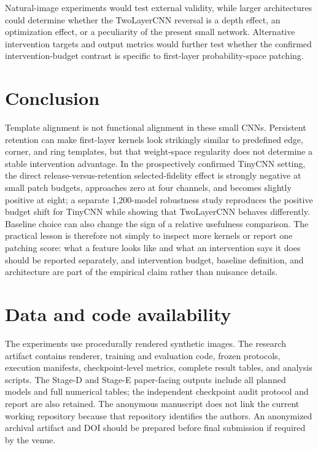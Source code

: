 \documentclass[10pt]{article}
\begin{document}
Natural-image experiments would test external validity, while larger architectures could determine whether the TwoLayerCNN reversal is a depth effect, an optimization effect, or a peculiarity of the present small network. Alternative intervention targets and output metrics would further test whether the confirmed intervention-budget contrast is specific to first-layer probability-space patching.

\section{Conclusion}\label{sec:conclusion}

Template alignment is not functional alignment in these small CNNs. Persistent retention can make first-layer kernels look strikingly similar to predefined edge, corner, and ring templates, but that weight-space regularity does not determine a stable intervention advantage. In the prospectively confirmed TinyCNN setting, the direct release-versus-retention selected-fidelity effect is strongly negative at small patch budgets, approaches zero at four channels, and becomes slightly positive at eight; a separate 1,200-model robustness study reproduces the positive budget shift for TinyCNN while showing that TwoLayerCNN behaves differently. Baseline choice can also change the sign of a relative usefulness comparison. The practical lesson is therefore not simply to inspect more kernels or report one patching score: what a feature looks like and what an intervention says it does should be reported separately, and intervention budget, baseline definition, and architecture are part of the empirical claim rather than nuisance details.

\section{Data and code availability}\label{sec:availability}

The experiments use procedurally rendered synthetic images. The research artifact contains renderer, training and evaluation code, frozen protocols, execution manifests, checkpoint-level metrics, complete result tables, and analysis scripts. The Stage-D and Stage-E paper-facing outputs include all planned models and full numerical tables; the independent checkpoint audit protocol and report are also retained. The anonymous manuscript does not link the current working repository because that repository identifies the authors. An anonymized archival artifact and DOI should be prepared before final submission if required by the venue.
\end{document}

